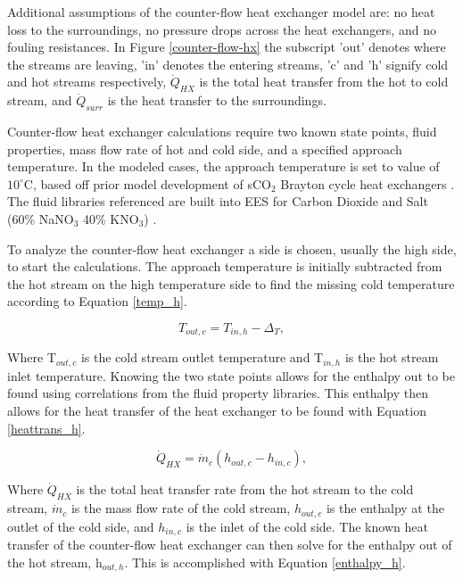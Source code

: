 \begin{paracol}{2}
\linenumbers
\switchcolumn

Additional assumptions of the counter-flow heat exchanger model are: no heat loss to the surroundings, no pressure drops across the heat exchangers, and no fouling resistances. In Figure \ref{counter-flow-hx} the subscript 'out' denotes where the streams are leaving, 'in' denotes the entering streams, 'c' and 'h' signify cold and hot streams respectively, $\dot{Q}_{HX}$ is the total heat transfer from the hot to cold stream, and $\dot{Q}_{surr}$ is the heat transfer to the surroundings.

Counter-flow heat exchanger calculations require two known state points, fluid properties, mass flow rate of hot and cold side, and a specified approach temperature. In the modeled cases, the approach temperature is set to value of $10^{\circ}$C, based off prior model development of sCO$_{2}$ Brayton cycle heat exchangers \cite{seidel_2010_model_development}. The fluid libraries referenced are built into EES for Carbon Dioxide and Salt (60\% NaNO$_3$ 40\% KNO$_3$) \cite{pacheco_1995_salt_properties,roland_1996_co2_properties}. 

To analyze the counter-flow heat exchanger a side is chosen, usually the high side, to start the calculations. The approach temperature is initially subtracted from the hot stream on the high temperature side to find the missing cold temperature according to Equation \ref{temp_h}. 

\begin{equation}
   \label{temp_h}
    T_{out,c} = T_{in,h}-\Delta_{T},
\end{equation}

Where T$_{out,c}$ is the cold stream outlet temperature and T$_{in,h}$ is the hot stream inlet temperature. Knowing the two state points allows for the enthalpy out to be found using correlations from the fluid property libraries. This enthalpy then allows for the heat transfer of the heat exchanger to be found with Equation \ref{heattrans_h}.

\begin{equation}
    \label{heattrans_h}
     \dot{Q}_{HX} = \dot{m}_{c}(h_{out,c}-h_{in,c}),
 \end{equation}

 Where $\dot{Q}_{HX}$ is the total heat transfer rate from the hot stream to the cold stream, $\dot{m}_{c}$ is the mass flow rate of the cold stream, $h_{out,c}$ is the enthalpy at the outlet of the cold side, and $h_{in,c}$ is the inlet of the cold side.
 The known heat transfer of the counter-flow heat exchanger can then solve for the enthalpy out of the hot stream, h$_{out,h}$. This is accomplished with Equation \ref{enthalpy_h}.


\end{paracol}
